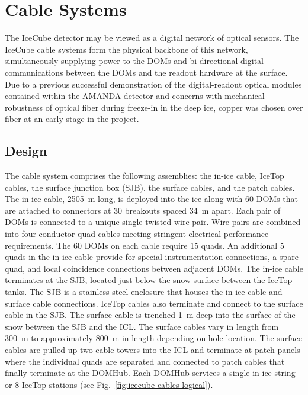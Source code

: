 \section{\label{sec:cable}Cable Systems}

The IceCube detector may be viewed as a digital network of optical
sensors. The IceCube cable systems form the physical backbone of this
network, simultaneously supplying power to the DOMs and bi-directional
digital communications between the DOMs and the readout hardware at the
surface. Due to a previous successful demonstration of the
digital-readout optical modules contained within the AMANDA detector
\cite{AMANDA:string18} and concerns with mechanical robustness of
optical fiber during
freeze-in in the deep ice, copper was chosen over fiber at an early stage in the
project.

\subsection{Design}

The cable system comprises the following assemblies: the in-ice cable,
IceTop cables, the surface junction box (SJB), the surface cables, and the patch
cables. The in-ice cable, 2505~m long, is deployed
into the ice along with 60 DOMs that are attached to connectors at 30
breakouts spaced 34~m apart. Each pair of DOMs is connected to a unique
single twisted wire pair. Wire pairs are combined into four-conductor quad
cables meeting stringent electrical performance requirements. The 60
DOMs on each cable require 15 quads. An additional 5 quads in the
in-ice cable provide for special instrumentation connections, a spare quad,
and local coincidence connections between adjacent DOMs. The in-ice
cable terminates at the SJB, located just below the snow surface between
the IceTop tanks. The SJB is a stainless steel
enclosure that houses the in-ice cable and surface cable
connections. IceTop cables also terminate and connect to the surface cable
in the SJB. The surface cable is trenched 1~m deep into the
surface of the snow between the SJB and the ICL. The surface
cables vary in length from 300~m to approximately 800~m in length depending on hole location. The surface cables are
pulled up two cable towers into the ICL and terminate at patch panels where the individual
quads are separated and connected to patch cables that finally terminate at the DOMHub. Each
DOMHub services a single in-ice string or 8 IceTop stations (see
Fig.~\ref{fig:icecube-cables-logical}). 

